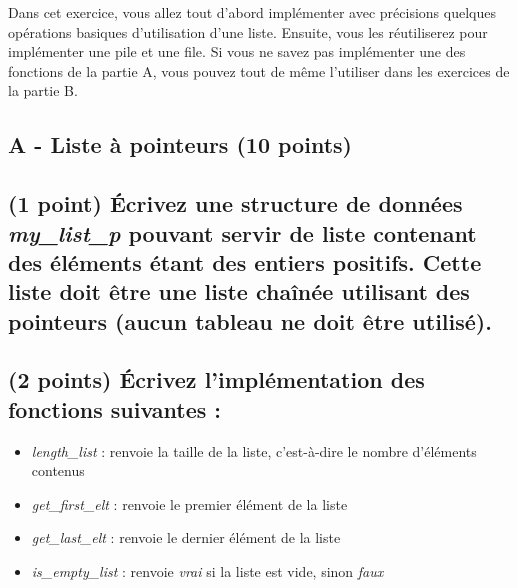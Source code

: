 \documentclass[11pt,a4paper]{article}
\begin{document}
%
%

Dans cet exercice, vous allez tout d'abord implémenter avec précisions quelques opérations basiques d'utilisation d'une liste.
Ensuite, vous les réutiliserez pour implémenter une pile et une file.
Si vous ne savez pas implémenter une des fonctions de la partie A, vous pouvez tout de même l'utiliser dans les exercices de la partie B.



\subsection*{A - Liste à pointeurs (10 points)}

\subsection{(1 point) \'Ecrivez une structure de données \og \textit{my\_list\_p} \fg{} pouvant servir de liste contenant des éléments étant des entiers positifs. Cette liste doit être une liste chaînée utilisant des pointeurs (aucun tableau ne doit être utilisé). }

\medskip

\begin{center}
\end{center}

\medskip

\subsection{(2 points) \'Ecrivez l'implémentation des fonctions suivantes : }

\begin{itemize}
\item \textit{length\_list} : renvoie la taille de la liste, c'est-à-dire le nombre d'éléments contenus
\item \textit{get\_first\_elt} : renvoie le premier élément de la liste
\item \textit{get\_last\_elt} : renvoie le dernier élément de la liste
\item \textit{is\_empty\_list} : renvoie \textit{vrai} si la liste est vide, sinon \textit{faux}
\end{itemize}
\end{document}
